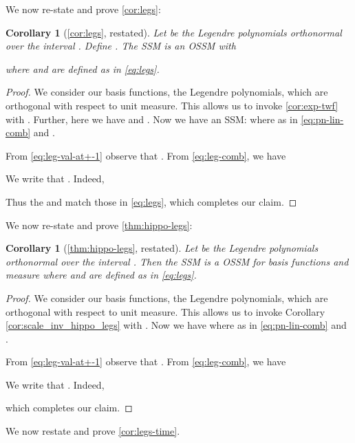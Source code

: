 \documentclass{article}
\newtheorem{corollary}[lemma]{Corollary}
\begin{document}
We now re-state and prove \cref{cor:legs}:
\begin{corollary}[\cref{cor:legs}, restated]
  Let  be the Legendre polynomials orthonormal over the interval . Define . The SSM 
  is an OSSM with
  
where  and  are defined as in \eqref{eq:legs}.
\end{corollary}
\begin{proof}
We consider our basis functions, the Legendre polynomials, which are orthogonal with respect to unit measure. This allows us to invoke \cref{cor:exp-twf} with . Further, here we have  and . Now we have an SSM:
  where
    as in \eqref{eq:pn-lin-comb} and .

  From \eqref{eq:leg-val-at+-1} observe that . From \eqref{eq:leg-comb}, we have

 We write that  . Indeed,


Thus the  and  match those in \eqref{eq:legs}, which completes our claim.
\end{proof}



We now re-state and prove \cref{thm:hippo-legs}:
\begin{corollary}[\cref{thm:hippo-legs}, restated]
  Let  be the Legendre polynomials orthonormal over the interval . Then the SSM
   is a OSSM for basis functions   and measure  where
    and  are defined as in \eqref{eq:legs}.
   \label{cor:appn-legs}
\end{corollary}
\begin{proof}
We consider our basis functions, the Legendre polynomials, which are orthogonal with respect to unit measure. This allows us to invoke Corollary \ref{cor:scale_inv_hippo_legs} with . Now we have
  where
    as in \eqref{eq:pn-lin-comb} and .

  From \eqref{eq:leg-val-at+-1} observe that . From \eqref{eq:leg-comb}, we have

 We write that  . Indeed,





which completes our claim.



\end{proof}


We now restate and prove \cref{cor:legs-time}.
\end{document}

